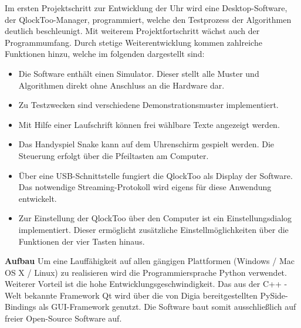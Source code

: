 \begin{multicols}{2}
Im ersten Projektschritt zur Entwicklung der Uhr wird eine Desktop-Software, der QlockToo-Manager, programmiert, welche den Testprozess der Algorithmen deutlich beschleunigt. Mit weiterem Projektfortschritt wächst auch der Programmumfang. Durch stetige Weiterentwicklung kommen zahlreiche Funktionen hinzu, welche im folgenden dargestellt sind:

\begin{itemize}
    \item Die Software enthält einen Simulator. Dieser stellt alle Muster und Algorithmen direkt ohne Anschluss an die Hardware dar.
    \item Zu Testzwecken sind verschiedene Demonstrationsmuster implementiert.
    \item Mit Hilfe einer Laufschrift können frei wählbare Texte angezeigt werden.
    \item Das Handyspiel Snake kann auf dem Uhrenschirm gespielt werden. Die Steuerung erfolgt über die Pfeiltasten am Computer.
    \item Über eine USB-Schnittstelle fungiert die QlockToo als Display der Software. Das notwendige Streaming-Protokoll wird eigens für diese Anwendung entwickelt.
    \item Zur Einstellung der QlockToo über den Computer ist ein Einstellungsdialog implementiert. Dieser ermöglicht zusätzliche Einstellmöglichkeiten über die Funktionen der vier Tasten hinaus.
\end{itemize}

\textbf{Aufbau}
Um eine Lauffähigkeit auf allen gängigen Plattformen (Windows / Mac OS X / Linux) zu realisieren wird die Programmiersprache Python verwendet. Weiterer Vorteil ist die hohe Entwicklungsgeschwindigkeit.
Das aus der C++ - Welt bekannte Framework Qt wird über die von Digia bereitgestellten PySide-Bindings als GUI-Framework genutzt. Die Software baut somit ausschließlich auf freier Open-Source Software auf.


\end{multicols}
